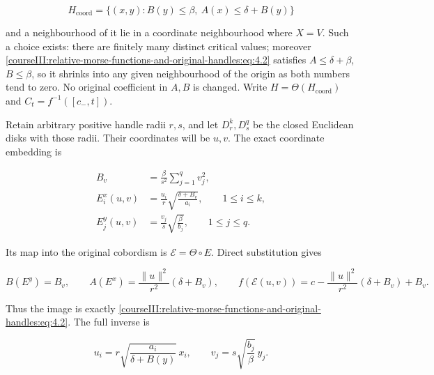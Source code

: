 \begin{equation}
H_{\mathrm{coord}}
=\{(x,y):B(y)\leq\beta,\ A(x)\leq\delta+B(y)\}
\label{courseIII:relative-morse-functions-and-original-handles:eq:4.2}
\end{equation}

and a neighbourhood of it lie in a coordinate neighbourhood where \(X=V\). Such a choice exists: there are finitely many distinct critical values; moreover \eqref{courseIII:relative-morse-functions-and-original-handles:eq:4.2} satisfies \(A\leq\delta+\beta\), \(B\leq\beta\), so it shrinks into any given neighbourhood of the origin as both numbers tend to zero. No original coefficient in \(A,B\) is changed. Write \(H=\Theta(H_{\mathrm{coord}})\) and \(C_t=f^{-1}([c_-,t])\).

Retain arbitrary positive handle radii \(r,s\), and let \(D_r^k,D_s^q\) be the closed Euclidean disks with those radii. Their coordinates will be \(u,v\). The exact coordinate embedding is

\begin{equation}
\begin{aligned}
B_v&=\frac{\beta}{s^2}\sum_{j=1}^q v_j^2,\\
E_i^x(u,v)&=\frac{u_i}{r}
       \sqrt{\frac{\delta+B_v}{a_i}},\qquad 1\leq i\leq k,\\
E_j^y(u,v)&=\frac{v_j}{s}
       \sqrt{\frac{\beta}{b_j}},\qquad 1\leq j\leq q.
\end{aligned}
\label{courseIII:relative-morse-functions-and-original-handles:eq:4.3}
\end{equation}

Its map into the original cobordism is \(\mathcal E=\Theta\circ E\). Direct substitution gives

\begin{equation}
B(E^y)=B_v,\qquad
A(E^x)=\frac{\|u\|^2}{r^2}(\delta+B_v),\qquad
f(\mathcal E(u,v))
=c-\frac{\|u\|^2}{r^2}(\delta+B_v)+B_v.
\label{courseIII:relative-morse-functions-and-original-handles:eq:4.4}
\end{equation}

Thus the image is exactly \eqref{courseIII:relative-morse-functions-and-original-handles:eq:4.2}. The full inverse is

\begin{equation}
u_i=r\sqrt{\frac{a_i}{\delta+B(y)}}\,x_i,
\qquad
v_j=s\sqrt{\frac{b_j}{\beta}}\,y_j.
\label{courseIII:relative-morse-functions-and-original-handles:eq:4.5}
\end{equation}


